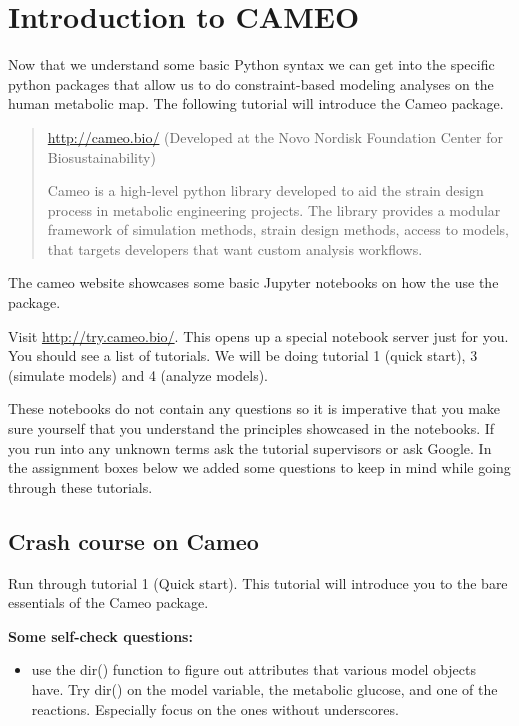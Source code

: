 \documentclass{article}
\begin{document}
\section{Introduction to CAMEO}
Now that we understand some basic Python syntax we can get into the specific python packages that allow us to do constraint-based modeling analyses on the human metabolic map. The following tutorial will introduce the Cameo package.

\begin{quote}
\url{http://cameo.bio/} (Developed at the Novo Nordisk Foundation Center for Biosustainability)

Cameo is a high-level python library developed to aid the strain design process in metabolic engineering projects. The library provides a modular framework of simulation methods, strain design methods, access to models, that targets developers that want custom analysis workflows.
\end{quote}

The cameo website showcases some basic Jupyter notebooks on how the use the package.

\begin{tcolorbox}[width=\textwidth,colback={yellow},title={ASSIGNMENT},coltitle=white]

Visit \url{http://try.cameo.bio/}. This opens up a special notebook server just for you. You should see a list of tutorials. We will be doing tutorial 1 (quick start), 3 (simulate models) and 4 (analyze models).

These notebooks do not contain any questions so it is imperative that you make sure yourself that you understand the principles showcased in the notebooks. If you run into any unknown terms ask the tutorial supervisors or ask Google. In the assignment boxes below we added some questions to keep in mind while going through these tutorials.
\end{tcolorbox}

\subsection*{Crash course on Cameo}
\begin{tcolorbox}[width=\textwidth,colback={yellow},title={ASSIGNMENT},coltitle=white]

Run through tutorial 1 (Quick start). This tutorial will introduce you to the bare essentials of the Cameo package.

\textbf{Some self-check questions:}
\begin{itemize}
\item use the dir() function to figure out attributes that various model objects have. Try dir() on the model variable, the metabolic glucose, and one of the reactions. Especially focus on the ones without underscores.
\end{itemize}
\end{tcolorbox}
\end{document}
